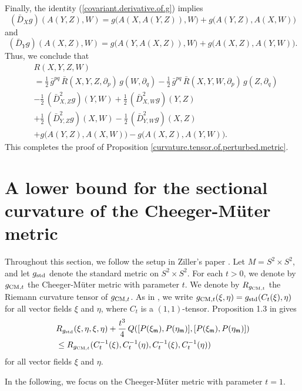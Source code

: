 \documentclass[11pt]{amsart}
\theoremstyle{definition}
\begin{document}
Finally, the identity (\ref{covariant.derivative.of.g}) implies 
\[(\bar{D}_X g)(A(Y,Z),W) = g \big ( A(X,A(Y,Z)),W \big ) + g \big ( A(Y,Z),A(X,W) \big )\] 
and 
\[(\bar{D}_Y g)(A(X,Z),W) = g \big ( A(Y,A(X,Z)),W \big ) + g \big ( A(X,Z),A(Y,W) \big ).\] 
Thus, we conclude that 
\begin{align*} 
&R(X,Y,Z,W) \\ 
&= \frac{1}{2} \, \bar{g}^{pq} \, \bar{R}(X,Y,Z,\partial_p) \, g(W,\partial_q) - \frac{1}{2} \, \bar{g}^{pq} \, \bar{R}(X,Y,W,\partial_p) \, g(Z,\partial_q) \\ 
&- \frac{1}{2} \, (\bar{D}_{X,Z}^2 g)(Y,W) + \frac{1}{2} \, (\bar{D}_{X,W}^2 g)(Y,Z) \\ 
&+ \frac{1}{2} \, (\bar{D}_{Y,Z}^2 g)(X,W) - \frac{1}{2} \, (\bar{D}_{Y,W}^2 g)(X,Z) \\ 
&+ g \big ( A(Y,Z),A(X,W) \big ) - g \big ( A(X,Z),A(Y,W) \big ). 
\end{align*} 
This completes the proof of Proposition \ref{curvature.tensor.of.perturbed.metric}. \\

\section{A lower bound for the sectional curvature of the Cheeger-M\"uter metric}

Throughout this section, we follow the setup in Ziller's paper \cite{Ziller}. Let $M = S^2 \times S^2$, and let $g_{\text{\rm std}}$ denote the standard metric on $S^2 \times S^2$. For each $t > 0$, we denote by $g_{\text{\rm CM},t}$ the Cheeger-M\"uter metric with parameter $t$. We denote by $R_{g_{\text{\rm CM},t}}$ the Riemann curvature tensor of $g_{\text{\rm CM},t}$. As in \cite{Ziller}, we write $g_{\text{\rm CM},t}(\xi,\eta) = g_{\text{\rm std}}(C_t(\xi),\eta)$ for all vector fields $\xi$ and $\eta$, where $C_t$ is a $(1,1)$-tensor. Proposition 1.3 in \cite{Ziller} gives  
\begin{align*} 
&R_{g_{\text{\rm std}}}(\xi,\eta,\xi,\eta) + \frac{t^3}{4} \, Q([P(\xi_{\mathfrak{m}}),P(\eta_{\mathfrak{m}})],[P(\xi_{\mathfrak{m}}),P(\eta_{\mathfrak{m}})]) \\ 
&\leq R_{g_{\text{\rm CM},t}}(C_t^{-1}(\xi),C_t^{-1}(\eta),C_t^{-1}(\xi),C_t^{-1}(\eta))
\end{align*}
for all vector fields $\xi$ and $\eta$. 

In the following, we focus on the Cheeger-M\"uter metric with parameter $t=1$.
\end{document}
